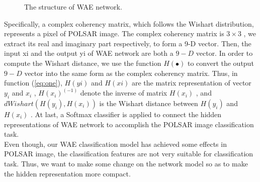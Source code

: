 \documentclass[11pt, a4paper, onecolumn, oneside]{article}
\begin{document}
\begin{figure}
\centering
{}
\caption{The structure of WAE network.}
\label{fig:one}
\end{figure}

Specifically, a complex coherency matrix, which follows the Wishart distribution, represents a pixel of POLSAR image. The complex coherency matrix is $3\times 3$ , we extract its real and imaginary part respectively, to form a 9-D vector. Then, the input xi and the output yi of WAE network are both a $9-D$ vector. In order to compute the Wishart distance, we use the function $H(\bullet)$ to convert the output $9-D$ vector into the same form as the complex coherency matrix. Thus, in function (\ref{eq:one}), $H(yi)$ and $H(xi)$ are the matrix representation of vector $y_i$ and $x_i$ , $H(x_i)^{(−1)}$ denote the inverse of matrix $H(x_i)$ , and $dWishart(H(y_i),H(x_i))$ is the Wishart distance between $H(y_i)$ and $H(x_i)$ \cite{c}. At last, a Softmax classifier is applied to connect the hidden representations of WAE network to accomplish the POLSAR image classification task.\\

Even though, our WAE classification model has achieved some effects in POLSAR image, the classification features are not very suitable for classification task. Thus, we want to make some change on the network model so as to make the hidden representation more compact.
\end{document}
